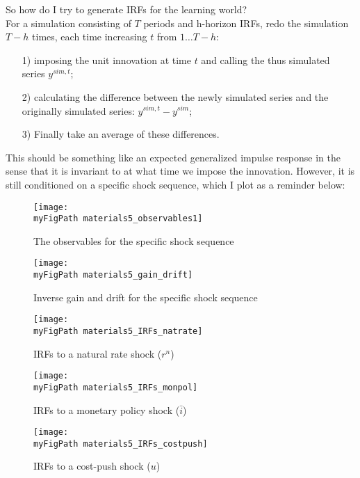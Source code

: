 \documentclass[11pt]{article}
\def \myFigPath {../figures/}
\renewcommand{\[}{\begin{equation}}
\renewcommand{\]}{\end{equation}}
\def\myFigScale{0.3}
\def\mySmallerFigScale{0.18}
\begin{document}
		So how do I try to generate IRFs for the learning world? \\
		For a simulation consisting of $T$ periods and h-horizon IRFs, redo the simulation $T-h$ times, each time increasing $t$ from $1\dots T-h$:
		\begin{enumerate}
		\item[1)] imposing the unit innovation at time $t$ and calling the thus simulated series $y^{sim,t}$;
		\item[2)] calculating the difference between the newly simulated series and the originally simulated series: $y^{sim,t} - y^{sim}$;
		\item[3)] Finally take an average of these differences. 
		\end{enumerate}
		This should be something like an expected generalized impulse response in the sense that it is invariant to at what time we impose the innovation. However, it is still conditioned on a specific shock sequence, which I plot as a reminder below:
\begin{figure}[h!]
\texttt{[image: \\myFigPath materials5\_observables1]} 
\caption{The observables for the specific shock sequence}
\end{figure}		

\begin{figure}[h!]
\texttt{[image: \\myFigPath materials5\_gain\_drift]} 
\caption{Inverse gain and drift for the specific shock sequence}
\end{figure}			
		
\begin{figure}[h!]
\texttt{[image: \\myFigPath materials5\_IRFs\_natrate]} 
\caption{IRFs to a natural rate shock ($r^n$)}
\end{figure}		

\begin{figure}[h!]
\texttt{[image: \\myFigPath materials5\_IRFs\_monpol]} 
\caption{IRFs to a monetary policy shock ($\bar{i}$)}
\end{figure}	

\begin{figure}[h!]
\texttt{[image: \\myFigPath materials5\_IRFs\_costpush]} 
\caption{IRFs to a cost-push shock ($u$)}
\end{figure}
\clearpage	
\end{document}
